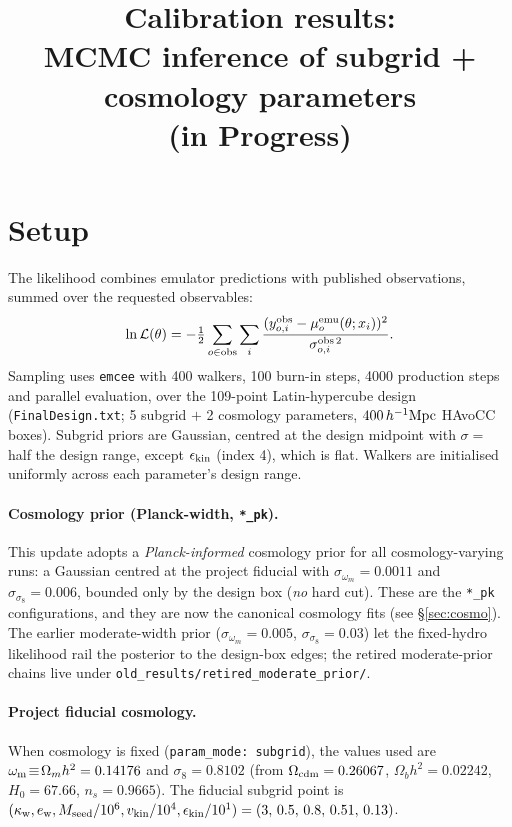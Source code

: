 \documentclass{article}
\title{Calibration results:\\
MCMC inference of subgrid + cosmology parameters \\ (in Progress)}
\author{}
\date{}
\begin{document}
\maketitle

\section{Setup}

The likelihood combines emulator predictions with published
observations, summed over the requested observables:
\begin{equation}
\ln\mathcal{L}(\theta) = -\tfrac{1}{2}\sum_{o\in \mathrm{obs}}
\sum_{i} \frac{(y^{\rm obs}_{o,i} - \mu^{\rm emu}_o(\theta;x_i))^2}
              {\sigma^{\rm obs\,2}_{o,i}}.
\end{equation}
Sampling uses \texttt{emcee} with 400 walkers, 100 burn-in steps, 4000
production steps and parallel evaluation, over the 109-point Latin-hypercube
design (\texttt{FinalDesign.txt}; 5 subgrid $+$ 2 cosmology parameters,
$400\,h^{-1}{\rm Mpc}$ HAvoCC boxes). Subgrid priors are Gaussian, centred
at the design midpoint with $\sigma=$ half the design range, except
$\epsilon_{\rm kin}$ (index 4), which is flat. Walkers are initialised
uniformly across each parameter's design range.

\paragraph{Cosmology prior (Planck-width, \texttt{*\_pk}).} This update adopts a
\emph{Planck-informed} cosmology prior for all cosmology-varying runs: a Gaussian
centred at the project fiducial with $\sigma_{\omega_m}=0.0011$ and
$\sigma_{\sigma_8}=0.006$, bounded only by the design box (\emph{no} hard cut).
These are the \texttt{*\_pk} configurations, and they are now the canonical
cosmology fits (see \S\ref{sec:cosmo}). The earlier moderate-width prior
($\sigma_{\omega_m}=0.005$, $\sigma_{\sigma_8}=0.03$) let the fixed-hydro
likelihood rail the posterior to the design-box edges; the retired moderate-prior
chains live under \texttt{old\_results/retired\_moderate\_prior/}.

\paragraph{Project fiducial cosmology.} When cosmology is fixed
(\texttt{param\_mode: subgrid}), the values used are
$\omega_{\rm m}\!\equiv\!\Omega_m h^2=0.14176$ and $\sigma_8=0.8102$
(from $\Omega_{\rm cdm}=0.26067$, $\Omega_b h^2=0.02242$, $H_0=67.66$,
$n_s=0.9665$). The fiducial subgrid point is
$(\kappa_{\rm w}, e_{\rm w}, M_{\rm seed}/10^6, v_{\rm kin}/10^4,
\epsilon_{\rm kin}/10^1) = (3,\,0.5,\,0.8,\,0.51,\,0.13)$.
\end{document}
